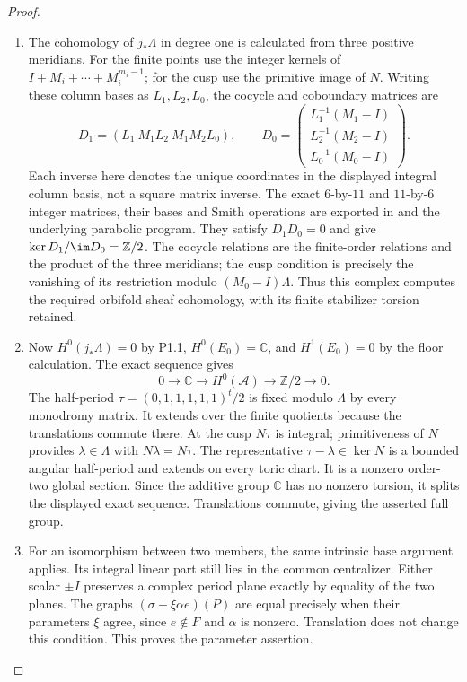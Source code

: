 \begin{proof}
\begin{enumerate}[label=\arabic*.]
\item The cohomology of $j_*\Lambda$ in degree one is calculated
from three positive meridians. For the finite points use
the integer kernels of $I+M_i+\cdots+M_i^{m_i-1}$;
for the cusp use the primitive image of $N$.
Writing these column bases as $L_1,L_2,L_0$, the cocycle
and coboundary matrices are
\[
D_1=(L_1\ M_1L_2\ M_1M_2L_0),\qquad
D_0=\begin{pmatrix}L_1^{-1}(M_1-I)\\
L_2^{-1}(M_2-I)\\L_0^{-1}(M_0-I)\end{pmatrix}.
\]
Each inverse here denotes the unique coordinates in the
displayed integral column basis, not a square matrix
inverse. The exact $6$-by-$11$ and $11$-by-$6$ integer
matrices, their bases and Smith operations are exported
in  and the
underlying parabolic program. They satisfy $D_1D_0=0$ and
give $\ker D_1/\im D_0=\mathbb Z/2$. The cocycle relations
are the finite-order relations and the product of the
three meridians; the cusp condition is precisely the
vanishing of its restriction modulo $(M_0-I)\Lambda$.
Thus this complex computes the required orbifold sheaf
cohomology, with its finite stabilizer torsion retained.

\item Now $H^0(j_*\Lambda)=0$ by P1.1,
$H^0(E_0)=\mathbb C$, and $H^1(E_0)=0$ by the floor
calculation. The exact sequence gives
\[
0\to\mathbb C\to H^0(\mathcal A)\to\mathbb Z/2\to0.
\]
The half-period
$\tau=(0,1,1,1,1,1)^t/2$ is fixed modulo $\Lambda$
by every monodromy matrix. It extends over the finite
quotients because the translations commute there.
At the cusp $N\tau$ is integral; primitiveness of $N$
provides $\lambda\in\Lambda$ with $N\lambda=N\tau$.
The representative $\tau-\lambda\in\ker N$ is a bounded
angular half-period and extends on every toric chart.
It is a nonzero order-two global section. Since the
additive group $\mathbb C$ has no nonzero torsion, it
splits the displayed exact sequence. Translations
commute, giving the asserted full group.

\item For an isomorphism between two members, the same intrinsic
base argument applies. Its integral linear part still
lies in the common centralizer. Either scalar $\pm I$
preserves a complex period plane exactly by equality
of the two planes. The graphs
$(\sigma+\xi\alpha e)(P)$ are equal precisely when their
parameters $\xi$ agree, since $e\notin F$ and $\alpha$
is nonzero. Translation does not change this condition.
This proves the parameter assertion.

\end{enumerate}
\end{proof}
